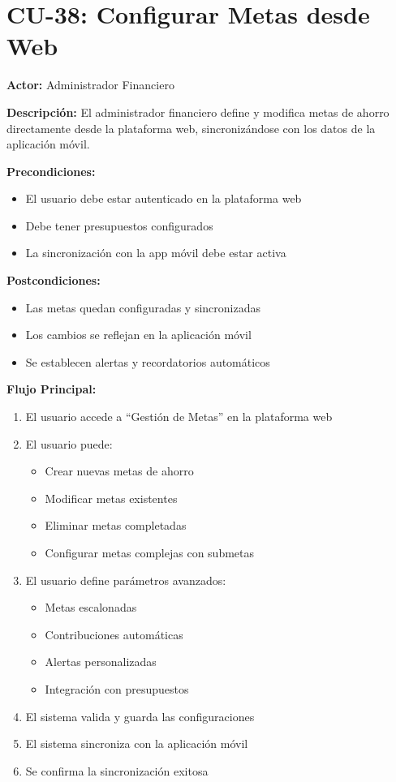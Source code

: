 \section{CU-38: Configurar Metas desde Web}

\noindent\textbf{Actor:} Administrador Financiero

\noindent\textbf{Descripción:} El administrador financiero define y modifica metas de ahorro directamente desde la plataforma web, sincronizándose con los datos de la aplicación móvil.

\noindent\textbf{Precondiciones:}
\begin{itemize}
    \item El usuario debe estar autenticado en la plataforma web
    \item Debe tener presupuestos configurados
    \item La sincronización con la app móvil debe estar activa
\end{itemize}

\noindent\textbf{Postcondiciones:}
\begin{itemize}
    \item Las metas quedan configuradas y sincronizadas
    \item Los cambios se reflejan en la aplicación móvil
    \item Se establecen alertas y recordatorios automáticos
\end{itemize}

\noindent\textbf{Flujo Principal:}
\begin{enumerate}
    \item El usuario accede a ``Gestión de Metas'' en la plataforma web
    \item El usuario puede:
    \begin{itemize}
        \item Crear nuevas metas de ahorro
        \item Modificar metas existentes
        \item Eliminar metas completadas
        \item Configurar metas complejas con submetas
    \end{itemize}
    \item El usuario define parámetros avanzados:
    \begin{itemize}
        \item Metas escalonadas
        \item Contribuciones automáticas
        \item Alertas personalizadas
        \item Integración con presupuestos
    \end{itemize}
    \item El sistema valida y guarda las configuraciones
    \item El sistema sincroniza con la aplicación móvil
    \item Se confirma la sincronización exitosa
\end{enumerate}